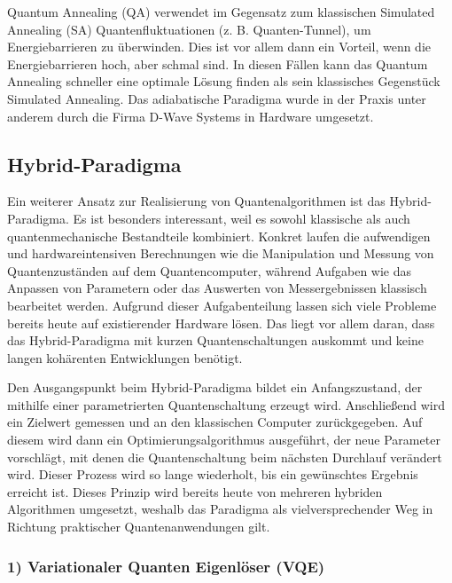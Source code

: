 Quantum Annealing (QA) verwendet im Gegensatz zum klassischen Simulated Annealing (SA) Quantenfluktuationen (z. B. Quanten-Tunnel), um Energiebarrieren zu überwinden. Dies ist vor allem dann ein Vorteil, wenn die Energiebarrieren hoch, aber schmal sind. In diesen Fällen kann das Quantum Annealing schneller eine optimale Lösung finden als sein klassisches Gegenstück Simulated Annealing. Das adiabatische Paradigma wurde in der Praxis unter anderem durch die Firma D-Wave Systems in Hardware umgesetzt. \autocite[2-4]{rajak_quantum_nodate} \autocite[4-5, 42-43]{albash_adiabatic_2018}

\subsection{Hybrid-Paradigma}

Ein weiterer Ansatz zur Realisierung von Quantenalgorithmen ist das Hybrid-Paradigma. Es ist besonders interessant, weil es sowohl klassische als auch quantenmechanische Bestandteile kombiniert. Konkret laufen die aufwendigen und hardwareintensiven Berechnungen wie die Manipulation und Messung von Quantenzuständen auf dem Quantencomputer, während Aufgaben wie das Anpassen von Parametern oder das Auswerten von Messergebnissen klassisch bearbeitet werden. Aufgrund dieser Aufgabenteilung lassen sich viele Probleme bereits heute auf existierender Hardware lösen. Das liegt vor allem daran, dass das Hybrid-Paradigma mit kurzen Quantenschaltungen auskommt und keine langen kohärenten Entwicklungen benötigt. \autocite[1-2]{cerezo_variational_nodate}

Den Ausgangspunkt beim Hybrid-Paradigma bildet ein Anfangszustand, der mithilfe einer parametrierten Quantenschaltung erzeugt wird. Anschließend wird ein Zielwert gemessen und an den klassischen Computer zurückgegeben. Auf diesem wird dann ein Optimierungsalgorithmus ausgeführt, der neue Parameter vorschlägt, mit denen die Quantenschaltung beim nächsten Durchlauf verändert wird. Dieser Prozess wird so lange wiederholt, bis ein gewünschtes Ergebnis erreicht ist. Dieses Prinzip wird bereits heute von mehreren hybriden Algorithmen umgesetzt, weshalb das Paradigma als vielversprechender Weg in Richtung praktischer Quantenanwendungen gilt.

\subsubsection*{1) Variationaler Quanten Eigenlöser (VQE)}
\label{nisq-definition}

